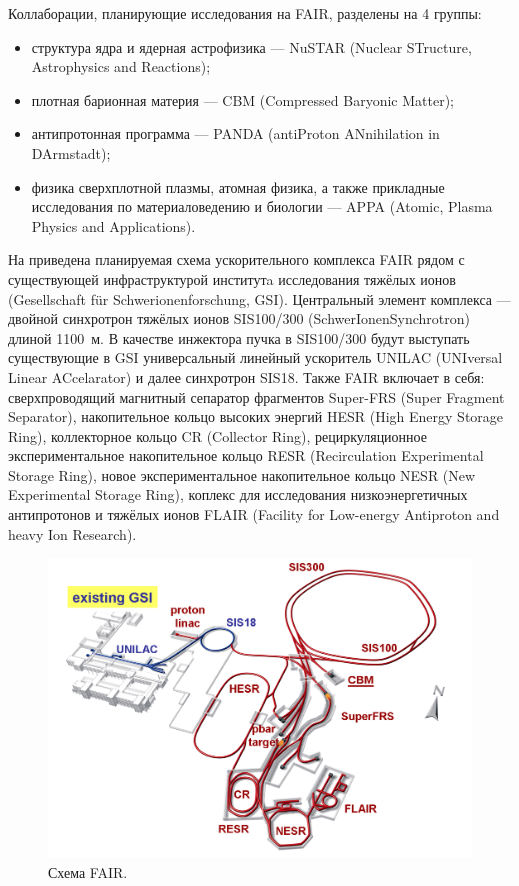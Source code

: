 Коллаборации, планирующие исследования на FAIR, разделены на 4 группы:
\begin{itemize}
\item структура ядра и ядерная астрофизика --- NuSTAR (Nuclear STructure, Astrophysics and Reactions);
\item плотная барионная материя --- CBM (Compressed Baryonic Matter);
\item антипротонная программа --- PANDA (antiProton ANnihilation in DArmstadt);
\item физика сверхплотной плазмы, атомная физика, а также прикладные исследования по материаловедению и биологии --- APPA (Atomic, Plasma Physics and Applications).
\end{itemize}

На  приведена планируемая схема ускорительного комплекса FAIR рядом с существующей инфраструктурой институтa исследования тяжёлых ионов (Gesellschaft f\"{u}r Schwerionenforschung, GSI).
Центральный элемент комплекса --- двойной синхротрон тяжёлых ионов SIS100/300 (SchwerIonenSynchrotron) длиной 1100~м. В качестве инжектора пучка в SIS100/300 будут выступать существующие в GSI универсальный линейный ускоритель UNILAC (UNIversal Linear ACcelarator) и далее синхротрон SIS18.
Также FAIR включает в себя:
сверхпроводящий магнитный сепаратор фрагментов Super-FRS (Super Fragment Separator),
накопительное кольцо высоких энергий HESR (High Energy Storage Ring),
коллекторное кольцо CR (Collector Ring),
рециркуляционное экспериментальное накопительное кольцо RESR (Recirculation Experimental Storage Ring), 
новое экспериментальное накопительное кольцо NESR (New Experimental Storage Ring),
коплекс для исследования низкоэнергетичных антипротонов и тяжёлых ионов FLAIR (Facility for Low-energy Antiproton and heavy Ion Research).

\begin{figure}[H]
\includegraphics[width=1.0\textwidth]{pictures/FAIR_structure.png}
\caption{Схема FAIR.}
\label{fig:FAIRstructure}
\end{figure}

